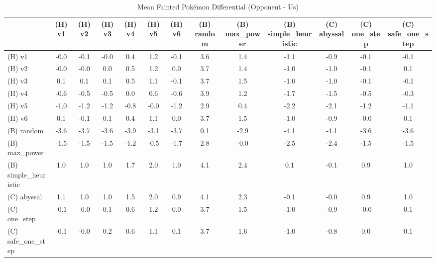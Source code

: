 \begin{table}[htbp]
\caption{Mean Fainted Pokémon Differential (Opponent - Us)}
\label{tab:fainted_diff}
\begin{tabular}{lcccccccccccc}
\hline
 & (H) v1 & (H) v2 & (H) v3 & (H) v4 & (H) v5 & (H) v6 & (B) random & (B) max\_power & (B) simple\_heuristic & (C) abyssal & (C) one\_step & (C) safe\_one\_step \\
\hline
(H) v1 & -0.0 & -0.1 & -0.0 & 0.4 & 1.2 & -0.1 & 3.6 & 1.4 & -1.1 & -0.9 & -0.1 & -0.1 \\
(H) v2 & -0.0 & -0.0 & 0.0 & 0.5 & 1.2 & 0.0 & 3.7 & 1.4 & -1.0 & -1.0 & -0.1 & 0.1 \\
(H) v3 & 0.1 & 0.1 & 0.1 & 0.5 & 1.1 & -0.1 & 3.7 & 1.5 & -1.0 & -1.0 & -0.1 & -0.1 \\
(H) v4 & -0.6 & -0.5 & -0.5 & 0.0 & 0.6 & -0.6 & 3.9 & 1.2 & -1.7 & -1.5 & -0.5 & -0.3 \\
(H) v5 & -1.0 & -1.2 & -1.2 & -0.8 & -0.0 & -1.2 & 2.9 & 0.4 & -2.2 & -2.1 & -1.2 & -1.1 \\
(H) v6 & 0.1 & -0.1 & 0.1 & 0.4 & 1.1 & 0.0 & 3.7 & 1.5 & -1.0 & -0.9 & -0.0 & 0.1 \\
(B) random & -3.6 & -3.7 & -3.6 & -3.9 & -3.1 & -3.7 & 0.1 & -2.9 & -4.1 & -4.1 & -3.6 & -3.6 \\
(B) max\_power & -1.5 & -1.5 & -1.5 & -1.2 & -0.5 & -1.7 & 2.8 & -0.0 & -2.5 & -2.4 & -1.5 & -1.5 \\
(B) simple\_heuristic & 1.0 & 1.0 & 1.0 & 1.7 & 2.0 & 1.0 & 4.1 & 2.4 & 0.1 & -0.1 & 0.9 & 1.0 \\
(C) abyssal & 1.1 & 1.0 & 1.0 & 1.5 & 2.0 & 0.9 & 4.1 & 2.3 & -0.1 & -0.0 & 0.9 & 1.0 \\
(C) one\_step & -0.1 & -0.0 & 0.1 & 0.6 & 1.2 & 0.0 & 3.7 & 1.5 & -1.0 & -0.9 & -0.0 & 0.1 \\
(C) safe\_one\_step & -0.1 & -0.0 & 0.2 & 0.6 & 1.1 & 0.1 & 3.7 & 1.6 & -1.0 & -0.8 & 0.0 & 0.1 \\
\hline
\end{tabular}
\end{table}
